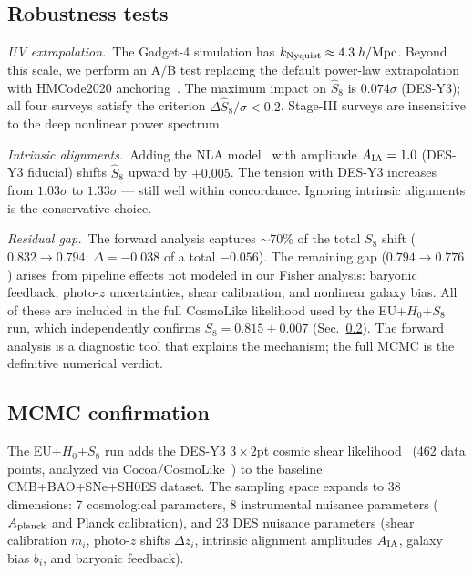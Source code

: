 \documentclass[a4paper,fleqn]{cas-dc}
\begin{document}
\subsection{Robustness tests}
\label{sec:s8_robustness}

\textit{UV extrapolation.}~The Gadget-4 simulation has
$k_{\rm Nyquist} \approx 4.3\;h/\text{Mpc}$. Beyond this
scale, we perform an A/B test replacing the default
power-law extrapolation with HMCode2020
anchoring~\cite{mead2021}. The maximum impact on
$\hat{S}_8$ is $0.074\sigma$ (DES-Y3); all four
surveys satisfy the criterion $\Delta\hat{S}_8/\sigma
< 0.2$. Stage-III surveys are insensitive to the
deep nonlinear power spectrum.

\textit{Intrinsic alignments.}~Adding the NLA
model~\cite{bridle2007} with amplitude $A_{\rm IA} = 1.0$
(DES-Y3 fiducial) shifts $\hat{S}_8$ upward by $+0.005$.
The tension with DES-Y3 increases from $1.03\sigma$ to
$1.33\sigma$ --- still well within concordance. Ignoring
intrinsic alignments is the conservative choice.

\textit{Residual gap.}~The forward analysis captures
$\sim\!70\%$ of the total $S_8$ shift ($0.832 \to 0.794$;
$\Delta = -0.038$ of a total $-0.056$). The remaining
gap ($0.794 \to 0.776$) arises from pipeline effects not
modeled in our Fisher analysis: baryonic feedback,
photo-$z$ uncertainties, shear calibration, and
nonlinear galaxy bias. All of these are included in the
full CosmoLike likelihood used by the EU+$H_0$+$S_8$ run, which
independently confirms $S_8 = 0.815 \pm 0.007$
(Sec.~\ref{sec:mcmc_confirmation}). The forward
analysis is a diagnostic tool that explains the
mechanism; the full MCMC is the definitive numerical
verdict.

\subsection{MCMC confirmation}
\label{sec:mcmc_confirmation}

The EU+$H_0$+$S_8$ run adds the DES-Y3 $3 \times 2$pt cosmic shear
likelihood~\cite{des2022} (462 data points, analyzed via
Cocoa/CosmoLike~\cite{krause2021}) to the baseline
CMB+BAO+SNe+SH0ES dataset. The sampling space expands
to 38 dimensions: 7 cosmological parameters,
8 instrumental nuisance parameters ($A_{\rm planck}$
and Planck calibration), and 23 DES nuisance parameters
(shear calibration $m_i$,
photo-$z$ shifts $\Delta z_i$, intrinsic alignment
amplitudes $A_{\rm IA}$, galaxy bias $b_i$, and
baryonic feedback).
\end{document}
